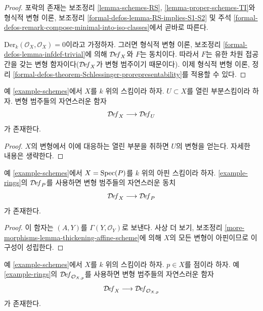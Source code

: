\begin{proof}
포락의 존재는 보조정리 \ref{lemma-schemes-RS},
\ref{lemma-proper-schemes-TI}와 형식적 변형 이론, 보조정리
\ref{formal-defos-lemma-RS-implies-S1-S2} 및 주석
\ref{formal-defos-remark-compose-minimal-into-iso-classes}에서 곧바로 따른다.

\medskip\noindent
$\text{Der}_k(\mathcal{O}_X, \mathcal{O}_X) = 0$이라고 가정하자. 그러면
형식적 변형 이론, 보조정리 \ref{formal-defos-lemma-infdef-trivial}에 의해
$\mathcal{D}\!\mathit{ef}_X$와 $F$는 동치이다. 따라서 $F$는 유한 차원
접공간을 갖는 변형 함자이다($\mathcal{D}\!\mathit{ef}_X$가 변형 범주이기
때문이다). 이제 형식적 변형 이론, 정리
\ref{formal-defos-theorem-Schlessinger-prorepresentability}를 적용할 수 있다.
\end{proof}

\begin{lemma}
\label{lemma-open}
예 \ref{example-schemes}에서 $X$를 $k$ 위의 스킴이라 하자.
$U \subset X$를 열린 부분스킴이라 하자. 변형 범주들의 자연스러운 함자
$$
\mathcal{D}\!\mathit{ef}_X \longrightarrow \mathcal{D}\!\mathit{ef}_U
$$
가 존재한다.
\end{lemma}

\begin{proof}
$X$의 변형에서 이에 대응하는 열린 부분을 취하면 $U$의 변형을 얻는다.
자세한 내용은 생략한다.
\end{proof}

\begin{lemma}
\label{lemma-affine}
예 \ref{example-schemes}에서 $X = \mathop{\mathrm{Spec}}(P)$를 $k$ 위의 아핀 스킴이라 하자.
\ref{example-rings}의 $\mathcal{D}\!\mathit{ef}_P$를 사용하면 변형 범주들의
자연스러운 동치
$$
\mathcal{D}\!\mathit{ef}_X \longrightarrow \mathcal{D}\!\mathit{ef}_P
$$
가 존재한다.
\end{lemma}

\begin{proof}
이 함자는 $(A, Y)$를 $\Gamma(Y, \mathcal{O}_Y)$로 보낸다. 사상 더 보기,
보조정리 \ref{more-morphisms-lemma-thickening-affine-scheme}에 의해
$X$의 모든 변형이 아핀이므로 이 구성이 성립한다.
\end{proof}

\begin{lemma}
\label{lemma-local-ring}
예 \ref{example-schemes}에서 $X$를 $k$ 위의 스킴이라 하자.%
$p \in X$를 점이라 하자. 예 \ref{example-rings}의
$\mathcal{D}\!\mathit{ef}_{\mathcal{O}_{X, p}}$를 사용하면 변형 범주들의
자연스러운 함자
$$
\mathcal{D}\!\mathit{ef}_X
\longrightarrow
\mathcal{D}\!\mathit{ef}_{\mathcal{O}_{X, p}}
$$
가 존재한다.
\end{lemma}

